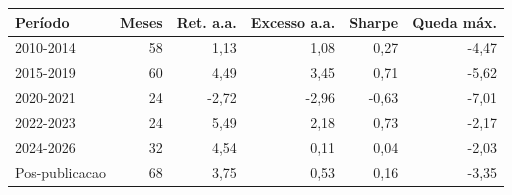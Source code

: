 \begin{tabular}{lrrrrr}
\toprule
Período & Meses & Ret. a.a. & Excesso a.a. & Sharpe & Queda máx. \\
\midrule
2010-2014 & 58 & 1,13 & 1,08 & 0,27 & -4,47 \\
2015-2019 & 60 & 4,49 & 3,45 & 0,71 & -5,62 \\
2020-2021 & 24 & -2,72 & -2,96 & -0,63 & -7,01 \\
2022-2023 & 24 & 5,49 & 2,18 & 0,73 & -2,17 \\
2024-2026 & 32 & 4,54 & 0,11 & 0,04 & -2,03 \\
Pos-publicacao & 68 & 3,75 & 0,53 & 0,16 & -3,35 \\
\bottomrule
\end{tabular}